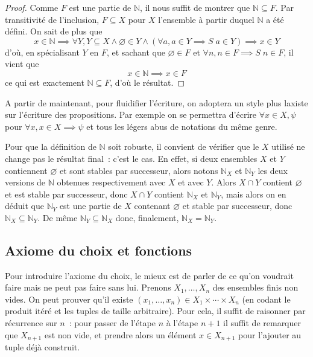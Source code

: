 \begin{proof}
  Comme $F$ est une partie de $\mathbb N$, il nous suffit de montrer que
  $\mathbb N \subseteq F$. Par transitivité de l'inclusion,
  $F\subseteq X$ pour $X$ l'ensemble à partir duquel $\mathbb N$ a été défini.
  On sait de plus que
  \[x \in \mathbb N \implies \forall Y, Y\subseteq X \land
  \varnothing \in Y \land (\forall a, a \in Y \implies S\;a \in Y) \implies
  x\in Y\]
  d'où, en spécialisant $Y$ en $F$, et sachant que $\varnothing\in F$ et
  $\forall n, n \in F \implies S\;n \in F$, il vient que
  \[x\in \mathbb N \implies x \in F\] ce qui est exactement
  $\mathbb N\subseteq F$, d'où le résultat.
\end{proof}

\begin{notation}
  A partir de maintenant, pour fluidifier l'écriture, on adoptera un style plus
  laxiste sur l'écriture des propositions. Par exemple on se permettra d'écrire
  $\forall x \in X, \psi$ pour $\forall x, x\in X \implies \psi$ et tous les
  légers abus de notations du même genre.
\end{notation}

\begin{remark}
  Pour que la définition de $\mathbb N$ soit robuste, il convient de vérifier
  que le $X$ utilisé ne change pas le résultat final~: c'est le cas. En effet,
  si deux ensembles $X$ et $Y$ contiennent $\varnothing$ et sont stables par
  successeur, alors notons $\mathbb N_X$ et $\mathbb N_Y$ les deux versions de
  $\mathbb N$ obtenues respectivement avec $X$ et avec $Y$. Alors $X\cap Y$
  contient $\varnothing$ et est stable par successeur, donc $X\cap Y$ contient
  $\mathbb N_X$ et $\mathbb N_Y$, mais alors on en déduit que $\mathbb N_Y$ est
  une partie de $X$ contenant $\varnothing$ et stable par successeur, donc
  $\mathbb N_X \subseteq \mathbb N_Y$. De même $\mathbb N_Y\subseteq\mathbb N_X$
  donc, finalement, $\mathbb N_X = \mathbb N_Y$.
\end{remark}

\subsection{Axiome du choix et fonctions}

Pour introduire l'axiome du choix, le mieux est de parler de ce qu'on voudrait
faire mais ne peut pas faire sans lui. Prenons $X_1,\ldots,X_n$ des ensembles
finis non vides. On peut prouver qu'il existe
$(x_1,\ldots,x_n)\in X_1\times\cdots\times X_n$ (en codant le produit itéré et
les tuples de taille arbitraire). Pour cela, il suffit de raisonner par
récurrence sur $n$~: pour passer de l'étape $n$ à l'étape $n+1$ il suffit de
remarquer que $X_{n+1}$ est non vide, et prendre alors un élément $x\in X_{n+1}$
pour l'ajouter au tuple déjà construit.

